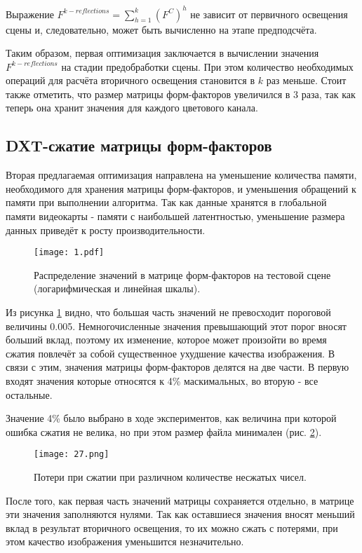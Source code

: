 \documentclass[12pt,fleqn]{article}
\begin{document}
Выражение $F^{k-reflections} = \sum\limits_{h = 1}^k \left(F^C\right)^h$ не зависит от первичного освещения сцены и, следовательно, может быть вычисленно на этапе предподсчёта.

Таким образом, первая оптимизация заключается в вычислении значения $F^{k-reflections}$ на стадии предобработки сцены. При этом количество необходимых операций для расчёта вторичного освещения становится в $k$ раз меньше. Стоит также отметить, что размер матрицы форм-факторов увеличился в 3 раза, так как теперь она хранит значения для каждого цветового канала.

\subsection{DXT-сжатие матрицы форм-факторов}

Вторая предлагаемая оптимизация направлена на уменьшение количества памяти, необходимого для хранения матрицы форм-факторов, и уменьшения обращений к памяти при выполнении алгоритма. Так как данные хранятся в глобальной памяти видеокарты - памяти с наибольшей латентностью, уменьшение размера данных приведёт к росту производительности.

\begin{figure}[htb]
    \centering
    \texttt{[image: 1.pdf]}
    \caption{Распределение значений в матрице форм-факторов на тестовой сцене (логарифмическая и линейная шкалы).}
    \label{init_distribution}
\end{figure}

Из рисунка \ref{init_distribution} видно, что большая часть значений не превосходит пороговой величины 0.005. Немногочисленные значения превышающий этот порог вносят больший вклад, поэтому их изменение, которое может произойти во время сжатия повлечёт за собой существенное ухудшение качества изображения. В связи с этим, значения матрицы форм-факторов делятся на две части. В первую входят значения которые относятся к 4\% маскимальных, во вторую - все остальные.

Значение 4\% было выбрано в ходе экспериментов, как величина при которой ошибка сжатия не велика, но при этом размер файла минимален (рис. \ref{part_error}).

\begin{figure}[htb]
    \centering
    \texttt{[image: 27.png]}
    \caption{Потери при сжатии при различном количестве несжатых чисел.}
    \label{part_error}
\end{figure}

После того, как первая часть значений матрицы сохраняется отдельно, в матрице эти значения заполняются нулями. Так как оставшиеся значения вносят меньший вклад в результат вторичного освещения, то их можно сжать с потерями, при этом качество изображения уменьшится незначительно.
\end{document}
